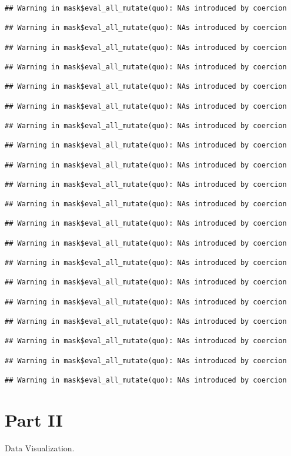\documentclass[
]{article}
\begin{document}
\begin{verbatim}
## Warning in mask$eval_all_mutate(quo): NAs introduced by coercion

## Warning in mask$eval_all_mutate(quo): NAs introduced by coercion

## Warning in mask$eval_all_mutate(quo): NAs introduced by coercion

## Warning in mask$eval_all_mutate(quo): NAs introduced by coercion

## Warning in mask$eval_all_mutate(quo): NAs introduced by coercion

## Warning in mask$eval_all_mutate(quo): NAs introduced by coercion

## Warning in mask$eval_all_mutate(quo): NAs introduced by coercion

## Warning in mask$eval_all_mutate(quo): NAs introduced by coercion

## Warning in mask$eval_all_mutate(quo): NAs introduced by coercion

## Warning in mask$eval_all_mutate(quo): NAs introduced by coercion

## Warning in mask$eval_all_mutate(quo): NAs introduced by coercion

## Warning in mask$eval_all_mutate(quo): NAs introduced by coercion

## Warning in mask$eval_all_mutate(quo): NAs introduced by coercion

## Warning in mask$eval_all_mutate(quo): NAs introduced by coercion

## Warning in mask$eval_all_mutate(quo): NAs introduced by coercion

## Warning in mask$eval_all_mutate(quo): NAs introduced by coercion

## Warning in mask$eval_all_mutate(quo): NAs introduced by coercion

## Warning in mask$eval_all_mutate(quo): NAs introduced by coercion

## Warning in mask$eval_all_mutate(quo): NAs introduced by coercion

## Warning in mask$eval_all_mutate(quo): NAs introduced by coercion
\end{verbatim}

\hypertarget{part-ii}{%
\section{Part II}\label{part-ii}}

Data Visualization.
\end{document}
